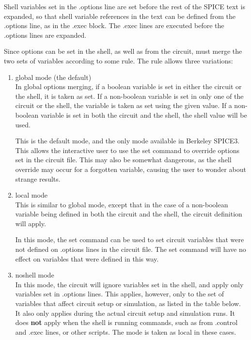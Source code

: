 Shell variables set in the {\vt .options} line are set before the rest
of the SPICE text is expanded, so that shell variable references in
the text can be defined from the {\vt .options} line, as in the {\vt
.exec} block.  The {\vt .exec} lines are executed before the {\vt
.options} lines are expanded.

Since options can be set in the shell, as well as from the circuit,
{\WRspice} must merge the two sets of variables according to some
rule.  The rule allows three variations:

\begin{enumerate}
\item{{\vt global} mode (the default)\\
In global options merging, if a boolean variable is set in either the
circuit or the shell, it is taken as set.  If a non-boolean variable
is set in only one of the circuit or the shell, the variable is taken
as set using the given value.  If a non-boolean variable is set in
both the circuit and the shell, the shell value will be used.

This is the default mode, and the only mode available in Berkeley
SPICE3.  This allows the interactive user to use the {\cb set} command
to override options set in the circuit file.  This may also be
somewhat dangerous, as the shell override may occur for a forgotten
variable, causing the user to wonder about strange results.}

\item{{\vt local} mode\\
This is similar to {\vt global} mode, except that in the case of a
non-boolean variable being defined in both the circuit and the shell,
the circuit definition will apply.

In this mode, the {\cb set} command can be used to set circuit
variables that were not defined on {\vt .options} lines in the circuit
file.  The {\cb set} command will have no effect on variables that
were defined in this way.}

\item{{\vt noshell} mode\\
In this mode, the circuit will ignore variables set in the shell, and
apply only variables set in {\vt .options} lines.  This applies,
however, only to the set of variables that affect circuit setup or
simulation, as listed in the table below.  It also only applies during
the actual circuit setup and simulation runs.  It does {\bf not} apply
when the shell is running commands, such as from {\vt .control} and
{\vt .exec} lines, or other scripts.  The mode is taken as {\vt local}
in these cases.}
\end{enumerate}


